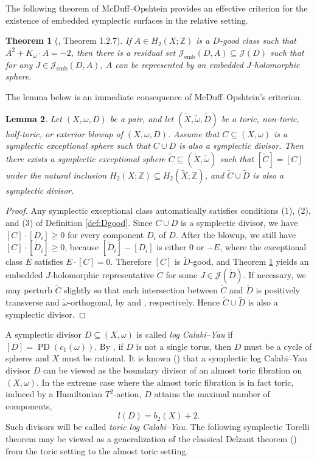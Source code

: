 \documentclass[11pt]{article}
\newtheorem{theorem}{Theorem}[section]
\newtheorem{lemma}[theorem]{Lemma}
\theoremstyle{definition}
\theoremstyle{remark}
\begin{document}
The following theorem of McDuff--Opshtein provides an effective criterion for the existence of embedded symplectic surfaces in the relative setting.

\begin{theorem}[\cite{MO15}, Theorem 1.2.7]\label{thm:MO15}
    If $A\in H_2(X;\mathbb{Z})$ is a $D$-good class such that $A^2+K_{\omega}\cdot A=-2$, then there is a residual set $\mathcal{J}_{\text{emb}}(D,A)\subseteq \mathcal{J}(D)$ such that for any $J\in \mathcal{J}_{\text{emb}}(D,A)$, $A$ can be represented by an embedded $J$-holomorphic sphere. 
\end{theorem}

The lemma below is an immediate consequence of McDuff--Opshtein's criterion.

\begin{lemma}\label{lem:blowupexceptional}
  Let $(X,\omega,D)$ be a pair, and let $(\tilde{X},\tilde{\omega},\tilde{D})$ be a toric, non-toric, half-toric, or exterior blowup of $(X,\omega,D)$. Assume that $C\subseteq (X,\omega)$ is a symplectic exceptional sphere such that $C\cup D$ is also a symplectic divisor. Then there exists a symplectic exceptional sphere $\tilde{C}\subseteq (\tilde{X},\tilde{\omega})$ such that $[\tilde{C}]=[C]$ under the natural inclusion $H_2(X;\mathbb{Z})\subseteq H_2(\tilde{X};\mathbb{Z})$, and $\tilde{C}\cup \tilde{D}$ is also a symplectic divisor.
\end{lemma}
\begin{proof}
  Any symplectic exceptional class automatically satisfies conditions (1), (2), and (3) of Definition \ref{def:Dgood}. Since $C\cup D$ is a symplectic divisor, we have $[C]\cdot[D_i]\geq 0$ for every component $D_i$ of $D$. After the blowup, we still have $[C]\cdot[\tilde{D}_i]\geq 0$, because $[\tilde{D}_i]-[D_i]$ is either $0$ or $-E$, where the exceptional class $E$ satisfies $E\cdot[C]=0$. Therefore $[C]$ is $\tilde{D}$-good, and Theorem \ref{thm:MO15} yields an embedded $J$-holomorphic representative $\tilde{C}$ for some $J\in\mathcal{J}(\tilde{D})$. If necessary, we may perturb $\tilde{C}$ slightly so that each intersection between $\tilde{C}$ and $\tilde{D}$ is positively transverse and $\tilde{\omega}$-orthogonal, by \cite[Corollary 3.4]{LiUsher} and \cite[Lemma 2.3]{Gompf}, respectively. Hence $\tilde{C}\cup\tilde{D}$ is also a symplectic divisor.
\end{proof}

A symplectic divisor $D\subseteq (X,\omega)$ is called \emph{log Calabi--Yau} if $[D]=\operatorname{PD}(c_1(\omega))$. By \cite[Lemma 3.1]{Limak}, if $D$ is not a single torus, then $D$ must be a cycle of spheres and $X$ must be rational. It is known (\cite{ATF}) that a symplectic log Calabi--Yau divisor $D$ can be viewed as the boundary divisor of an almost toric fibration on $(X,\omega)$. In the extreme case where the almost toric fibration is in fact toric, induced by a Hamiltonian $T^2$-action, $D$ attains the maximal number of components,
\[
  l(D)=b_2(X)+2.
\]
Such divisors will be called \emph{toric log Calabi--Yau}. The following symplectic Torelli theorem may be viewed as a generalization of the classical Delzant theorem (\cite{Delzant}) from the toric setting to the almost toric setting.
\end{document}
